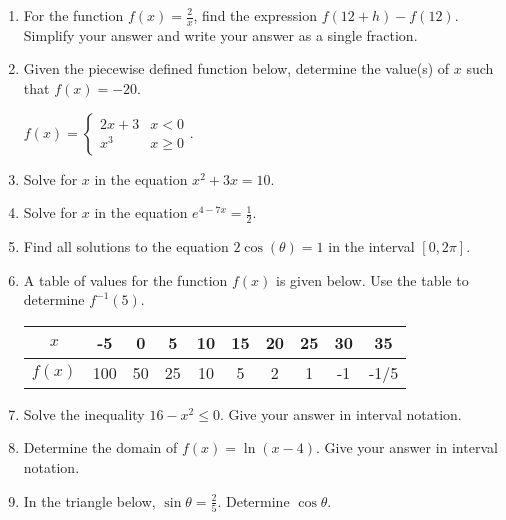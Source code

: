 \documentclass[12pt]{article}
\begin{document}
\begin{enumerate}
\item For the function $f(x)=\frac{2}{x}$, find the expression $f(12+h)-f(12).$ Simplify your answer and write your answer as a single fraction.\\

\item Given the piecewise defined function below, determine the value(s) of $x$ such that $f(x)=-20.$

$f(x)=\begin{cases} 2x+3 & x <0 \\ x^3 & x \geq 0 \end{cases}.$\\

\item Solve for $x$ in the equation $x^2+3x=10.$

\item Solve for $x$ in the equation $e^{4-7x}=\frac{1}{2}.$

\item Find all solutions to the equation $2\cos (\theta) = 1$ in the interval $[0, 2 \pi].$\\

\item A table of values for the function $f(x)$ is given below. Use the table to determine $f^{-1}(5).$

\begin{tabular}{|c||c|c|c|c|c|c|c|c|c|}
$x$&-5&0&5&10&15&20&25&30&35\\
\hline
$f(x)$&100&50&25&10&5&2&1&-1&-1/5\\
\end{tabular}

\item Solve the inequality $16-x^2\leq 0.$ Give your answer in interval notation.\\

\item Determine the domain of $f(x)=\ln(x-4).$ Give your answer in interval notation.\\

\item In the triangle below, $\sin \theta = \frac{2}{5}.$ Determine $\cos \theta.$ \\ 
 
 \hfill \underline{\hspace{2in}}


\end{enumerate}
\end{document}
